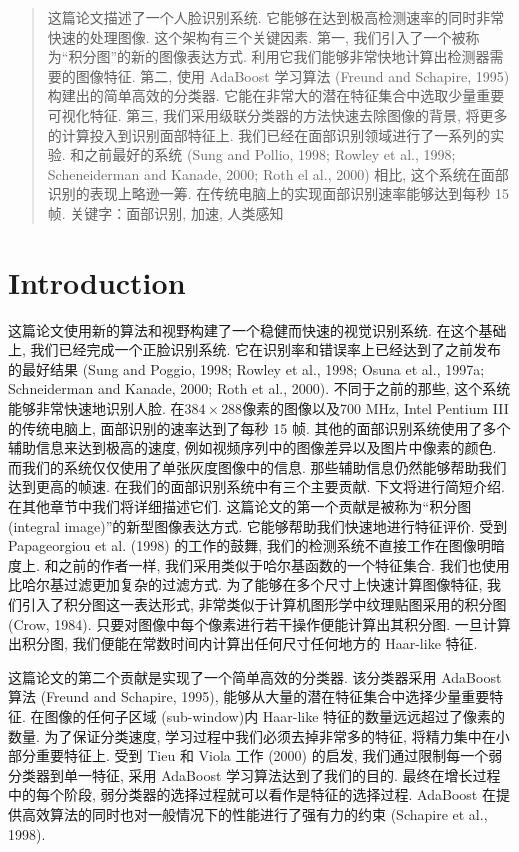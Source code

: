 \documentclass[utf8]{ctexart}
\begin{document}
\begin{abstract}
这篇论文描述了一个人脸识别系统. 它能够在达到极高检测速率的同时非常快速的处理图像. 这个架构有三个关键因素. 
第一, 我们引入了一个被称为“积分图”的新的图像表达方式. 利用它我们能够非常快地计算出检测器需要的图像特征. 
第二, 使用 AdaBoost 学习算法 (Freund and Schapire, 1995) 构建出的简单高效的分类器. 它能在非常大的潜在特征集合中选取少量重要可视化特征. 
第三, 我们采用级联分类器的方法快速去除图像的背景, 将更多的计算投入到识别面部特征上. 
我们已经在面部识别领域进行了一系列的实验. 和之前最好的系统 (Sung and Pollio, 1998; Rowley et al., 1998; Scheneiderman and Kanade, 2000; Roth el al., 2000) 相比, 这个系统在面部识别的表现上略逊一筹. 在传统电脑上的实现面部识别速率能够达到每秒 15 帧. 
关键字：面部识别, 加速, 人类感知
\end{abstract}
\section{Introduction}
这篇论文使用新的算法和视野构建了一个稳健而快速的视觉识别系统. 在这个基础上, 我们已经完成一个正脸识别系统. 它在识别率和错误率上已经达到了之前发布的最好结果 (Sung and Poggio, 1998; Rowley et al., 1998; Osuna et al., 1997a; Schneiderman and Kanade, 2000; Roth et al., 2000). 
不同于之前的那些, 这个系统能够非常快速地识别人脸. 在$384\times288$像素的图像以及700 MHz,  Intel Pentium III的传统电脑上, 面部识别的速率达到了每秒 15 帧. 
其他的面部识别系统使用了多个辅助信息来达到极高的速度, 例如视频序列中的图像差异以及图片中像素的颜色. 而我们的系统仅仅使用了单张灰度图像中的信息. 那些辅助信息仍然能够帮助我们达到更高的帧速. 
在我们的面部识别系统中有三个主要贡献. 下文将进行简短介绍. 在其他章节中我们将详细描述它们. 
这篇论文的第一个贡献是被称为“积分图 (integral image)”的新型图像表达方式. 它能够帮助我们快速地进行特征评价. 受到 Papageorgiou et al. (1998) 的工作的鼓舞, 我们的检测系统不直接工作在图像明暗度上. 
和之前的作者一样, 我们采用类似于哈尔基函数的一个特征集合. 我们也使用比哈尔基过滤更加复杂的过滤方式. 为了能够在多个尺寸上快速计算图像特征, 我们引入了积分图这一表达形式, 非常类似于计算机图形学中纹理贴图采用的积分图 (Crow, 1984). 
只要对图像中每个像素进行若干操作便能计算出其积分图. 一旦计算出积分图, 我们便能在常数时间内计算出任何尺寸任何地方的 Haar-like 特征. 

这篇论文的第二个贡献是实现了一个简单高效的分类器. 该分类器采用 AdaBoost 算法 (Freund and Schapire, 1995), 能够从大量的潜在特征集合中选择少量重要特征. 在图像的任何子区域 (sub-window)内 Haar-like 特征的数量远远超过了像素的数量. 
为了保证分类速度, 学习过程中我们必须去掉非常多的特征, 将精力集中在小部分重要特征上. 受到 Tieu 和 Viola 工作 (2000) 的启发, 我们通过限制每一个弱分类器到单一特征, 采用 AdaBoost 学习算法达到了我们的目的. 最终在增长过程中的每个阶段, 弱分类器的选择过程就可以看作是特征的选择过程.  AdaBoost 在提供高效算法的同时也对一般情况下的性能进行了强有力的约束 (Schapire et al., 1998). 
\end{document}
